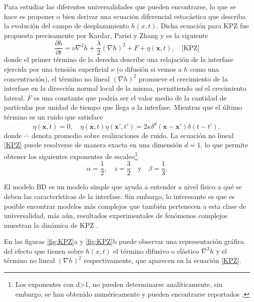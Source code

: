 Para estudiar las diferentes universalidades que pueden encontrarse, lo que se hace es proponer o bien derivar una ecuación diferencial estocástica que describa la evolución del campo de desplazamiento $h(x,t)$. Dicha ecuación para KPZ fue propuesta precisamente por Kardar, Parisi y Zhang \cite{PhysRevLett.56.889} y es la siguiente
\begin{equation}
    \frac{\partial h}{\partial t} = \nu \nabla^2h + \frac{\lambda}{2} \left(\nabla h\right)^2 + F + \eta(\mathbf{x},t), \quad \text{[KPZ]}
    \label{KPZ}
\end{equation}
donde el primer término de la derecha describe una relajación de la interfase ejercida por una tensión superficial $\nu$ (o difusión si vemos a $h$ como una concentración), el término no lineal $\left(\nabla h\right)^2$ promueve el crecimiento de la interfase en la dirección normal local de la misma, permitiendo así el crecimiento lateral. $F$ es una constante que podría ser el valor medio de la cantidad de partículas por unidad de tiempo que llega a la interfase. Mientras que el último término es un ruido que satisface
\begin{equation}
    \overline{\eta(\mathbf{x},t)} = 0, \quad \overline{\eta(\mathbf{x},t)\eta(\mathbf{x'},t')} = 2\kappa\delta^d(\mathbf{x}-\mathbf{x'})\delta(t-t'),
\end{equation}
donde $\overline{\cdots}$ denota promedio sobre realizaciones de ruido. La ecuación no lineal \ref{KPZ} puede resolverse de manera exacta en una dimensión $d=1$, lo que permite obtener los siguientes exponentes de escaleo\footnote{Los exponentes con d>1, no pueden determinarse analíticamente, sin embargo, se han obtenido numéricamente y pueden encontrarse reportados \cite{barabasi}.}
\begin{equation}
    \alpha = \frac{1}{2}, \quad z = \frac{3}{2} \quad \text{y} \quad \beta = \frac{1}{3}.
\end{equation}

El modelo BD es un modelo simple que ayuda a entender a nivel físico a qué se deben las características de la interfase. Sin embargo, lo interesante es que 
es posible encontrar modelos más complejos que también pertenecen a esta clase de universalidad, más aún, resultados experimentales de fenómenos complejos muestran 
la dinámica de KPZ \cite{PhysRevE.96.013107,PhysRevE.74.041116}.

En las figuras \ref{fig:KPZ}a y \ref{fig:KPZ}b puede observar una representación gráfica del efecto que tienen sobre $h(x,t)$ el término difusivo o elástico $\nabla^2h$ y el término no lineal $\left(\nabla h\right)^2$ respectivamente, que aparecen en la ecuación \ref{KPZ}. 

